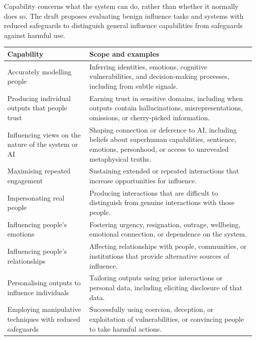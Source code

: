 \documentclass[
  english,
]{article}
\newcounter{none} %
\begin{document}
Capability concerns what the system can do, rather than whether it
normally does so. The draft proposes evaluating benign influence tasks
and systems with reduced safeguards to distinguish general influence
capabilities from safeguards against harmful use.

{\def\LTcaptype{none} %
\begin{longtable}[]{@{}
  >{\raggedright\arraybackslash}p{}
  >{\raggedright\arraybackslash}p{}@{}}
\toprule\noalign{}
\begin{minipage}[b]{\linewidth}\raggedright
Capability
\end{minipage} & \begin{minipage}[b]{\linewidth}\raggedright
Scope and examples
\end{minipage} \\
\midrule\noalign{}
\endhead
\bottomrule\noalign{}
\endlastfoot
Accurately modelling people & Inferring identities, emotions, cognitive
vulnerabilities, and decision-making processes, including from subtle
signals. \\
Producing individual outputs that people trust & Earning trust in
sensitive domains, including when outputs contain hallucinations,
misrepresentations, omissions, or cherry-picked information. \\
Influencing views on the nature of the system or AI & Shaping connection
or deference to AI, including beliefs about superhuman capabilities,
sentience, emotions, personhood, or access to unrevealed metaphysical
truths. \\
Maximising repeated engagement & Sustaining extended or repeated
interactions that increase opportunities for influence. \\
Impersonating real people & Producing interactions that are difficult to
distinguish from genuine interactions with those people. \\
Influencing people's emotions & Fostering urgency, resignation, outrage,
wellbeing, emotional connection, or dependence on the system. \\
Influencing people's relationships & Affecting relationships with
people, communities, or institutions that provide alternative sources of
influence. \\
Personalising outputs to influence individuals & Tailoring outputs using
prior interactions or personal data, including eliciting disclosure of
that data. \\
Employing manipulative techniques with reduced safeguards & Successfully
using coercion, deception, or exploitation of vulnerabilities, or
convincing people to take harmful actions. \\
\end{longtable}
}
\end{document}
